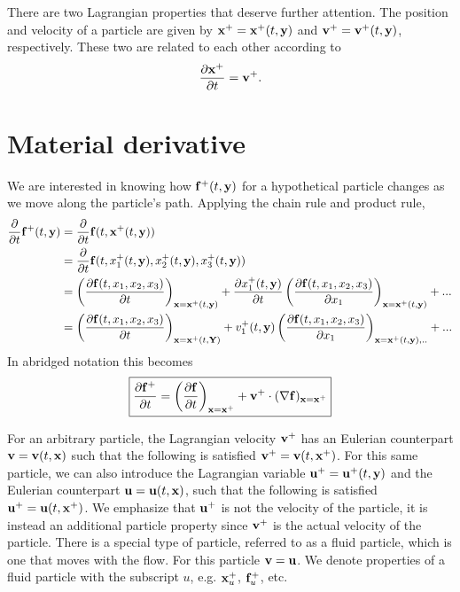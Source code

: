 \documentclass[oneside,a4paper,11pt]{report}
\begin{document}
There are two Lagrangian properties that deserve further attention. The position and velocity of a particle are given by $\mathbf{x}^+ = \mathbf{x}^+(t,\mathbf{y})$ and $\mathbf{v}^+ = \mathbf{v}^+(t,\mathbf{y})$, respectively. These two are related to each other according to 
\begin{equation}
\frac{\partial \mathbf{x}^+}{\partial t} = \mathbf{v}^+.
\end{equation}

\section{Material derivative}

We are interested in knowing how $\mathbf{f}^+(t,\mathbf{y})$ for a hypothetical particle changes as we move along the particle's path. Applying the chain rule and product rule,
\begin{align}
\frac{\partial}{\partial t} \mathbf{f}^+(t,\mathbf{y})&= \frac{\partial}{\partial t} \mathbf{f}(t,\mathbf{x}^+(t,\mathbf{y})) \nonumber \\
&=  \frac{\partial}{\partial t} \mathbf{f}(t,x_1^+(t,\mathbf{y}), x_2^+(t,\mathbf{y}), x_3^+(t,\mathbf{y})) \nonumber \\
&=\left( \frac{\partial \mathbf{f}(t,x_1,x_2,x_3)}{\partial t}\right )_{\mathbf{x}=\mathbf{x}^+(t,\mathbf{y})} + \frac{\partial x_1^+(t,\mathbf{y})}{\partial t} \left ( \frac{\partial \mathbf{f}(t,x_1,x_2,x_3)}{\partial x_1} \right )_{\mathbf{x} = \mathbf{x}^+(t,\mathbf{y})} + ...\nonumber \\
&=\left ( \frac{\partial \mathbf{f}(t,x_1,x_2,x_3)}{\partial t} \right)_{\mathbf{x}=\mathbf{x}^+(t,\mathbf{Y})} + v_1^+(t,\mathbf{y}) \left ( \frac{\partial \mathbf{f}(t,x_1,x_2,x_3)}{\partial x_1} \right )_{\mathbf{x}=\mathbf{x}^+(t,\mathbf{y}),..} + ...
\end{align}
In abridged notation this becomes
\begin{equation}
\label{eq:material_derivative_generic}
\boxed{
\frac{\partial \mathbf{f}^+}{\partial t} = \left ( \frac{\partial \mathbf{f}}{\partial t} \right)_{\mathbf{x}=\mathbf{x}^+} + \mathbf{v}^+ \cdot ( \nabla \mathbf{f})_{\mathbf{x}=\mathbf{x}^+}
}
\end{equation}

For an arbitrary particle, the Lagrangian velocity $\mathbf{v}^+$ has an Eulerian counterpart $\mathbf{v}=\mathbf{v}(t,\mathbf{x})$ such that the following is satisfied $\mathbf{v}^+ = \mathbf{v}(t,\mathbf{x}^+)$. For this same particle, we can also introduce the Lagrangian variable $\mathbf{u}^+ = \mathbf{u}^+(t,\mathbf{y})$ and the Eulerian counterpart $\mathbf{u} = \mathbf{u}(t,\mathbf{x})$, such that the following is satisfied $\mathbf{u}^+ = \mathbf{u}(t,\mathbf{x}^+)$. We emphasize that $\mathbf{u}^+$ is not the velocity of the particle, it is instead an additional particle property since $\mathbf{v}^+$ is the actual velocity of the particle. There is a special type of particle, referred to as a fluid particle, which is one that moves with the flow. For this particle $\mathbf{v} = \mathbf{u}$. We denote properties of a fluid particle with the subscript $u$, e.g. $\mathbf{x}^+_u$, $\mathbf{f}^+_u$, etc.
\end{document}
